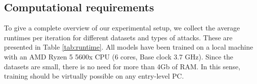 \subsection{Computational requirements}

To give a complete overview of our experimental setup, we collect the average runtimes per iteration for different datasets and types of attacks. These are presented in Table \ref{tab:runtime}. All models have been trained on a local machine with an AMD Ryzen 5 5600x CPU (6 cores, Base clock 3.7 GHz). Since the datasets are small, there is no need for more than 4Gb of RAM. In this sense, training should be virtually possible on any entry-level PC. 
\begin{table}[t!]
    \begin{minipage}{.65\textwidth}%
        \centering
\end{minipage}
\end{table}
